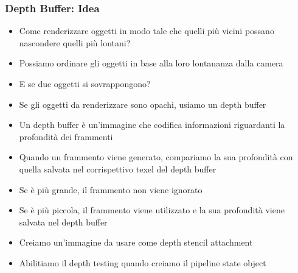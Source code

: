 \begin{frame}
\frametitle{Depth Buffer: Idea}
\begin{itemize}
\item Come renderizzare oggetti in modo tale che quelli più vicini possano nascondere quelli più lontani?
\item Possiamo ordinare gli oggetti in base alla loro lontananza dalla camera
\item E se due oggetti si sovrappongono?
\item Se gli oggetti da renderizzare sono opachi, usiamo un depth buffer
\item Un depth buffer è un'immagine che codifica informazioni riguardanti la profondità dei frammenti
\item Quando un frammento viene generato, compariamo la sua profondità con quella salvata nel corrispettivo texel del depth buffer
\item Se è più grande, il frammento non viene ignorato
\item Se è più piccola, il frammento viene utilizzato e la sua profondità viene salvata nel depth buffer
\item Creiamo un'immagine da usare come depth stencil attachment
\item Abilitiamo il depth testing quando creiamo il pipeline state object
\end{itemize}
\end{frame}
